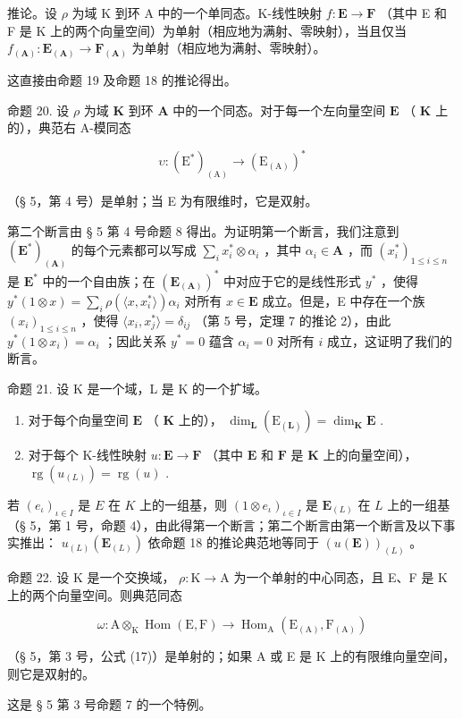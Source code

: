 推论。设 \(\rho\) 为域 K 到环 A 中的一个单同态。K-线性映射 \(f: \mathbf{E} \to \mathbf{F}\) （其中 E 和 F 是 K 上的两个向量空间）为单射（相应地为满射、零映射），当且仅当 \(f_{(\mathbf{A})}: \mathbf{E}_{(\mathbf{A})} \to \mathbf{F}_{(\mathbf{A})}\) 为单射（相应地为满射、零映射）。

这直接由命题 19 及命题 18 的推论得出。

命题 20. 设 \(\rho\) 为域 \(\mathbf{K}\) 到环 \(\mathbf{A}\) 中的一个同态。对于每一个左向量空间 \(\mathbf{E}\) （ \(\mathbf{K}\) 上的），典范右 A-模同态

\[
\upsilon : \left(\mathrm{E} ^ {*}\right) _ {(\mathrm{A})} \rightarrow \left(\mathrm{E} _ {(\mathrm{A})}\right) ^ {*}
\]

（§ 5，第 4 号）是单射；当 E 为有限维时，它是双射。

第二个断言由 § 5 第 4 号命题 8 得出。为证明第一个断言，我们注意到 \((\mathbf{E}^{*})_{(\mathbf{A})}\) 的每个元素都可以写成 \(\sum_{i} x_{i}^{*} \otimes \alpha_{i}\) ，其中 \(\alpha_{i} \in \mathbf{A}\) ，而 \((x_{i}^{*})_{1 \leqslant i \leqslant n}\) 是 \(\mathbf{E}^{*}\) 中的一个自由族；在 \((\mathbf{E}_{(\mathbf{A})})^{*}\) 中对应于它的是线性形式 \(y^{*}\) ，使得 \(y^{*}(1 \otimes x) = \sum_{i} \rho(\langle x, x_{i}^{*} \rangle)\alpha_{i}\) 对所有 \(x \in \mathbf{E}\) 成立。但是，E 中存在一个族 \((x_{i})_{1 \leqslant i \leqslant n}\) ，使得 \(\langle x_{i}, x_{j}^{*} \rangle = \delta_{ij}\) （第 5 号，定理 7 的推论 2），由此 \(y^{*}(1 \otimes x_{i}) = \alpha_{i}\) ；因此关系 \(y^{*} = 0\) 蕴含 \(\alpha_{i} = 0\) 对所有 \(i\) 成立，这证明了我们的断言。

命题 21. 设 K 是一个域，L 是 K 的一个扩域。

\begin{enumerate}
\def\labelenumi{(\roman{enumi})}
\item
  对于每个向量空间 \(\mathbf{E}\) （ \(\mathbf{K}\) 上的）， \(\dim_{\mathbf{L}}(\mathrm{E}_{(\mathbf{L})}) = \dim_{\mathbf{K}}\mathbf{E}\) .
\item
  对于每个 K-线性映射 \(u: \mathbf{E} \to \mathbf{F}\) （其中 \(\mathbf{E}\) 和 \(\mathbf{F}\) 是 \(\mathbf{K}\) 上的向量空间）， \(\operatorname{rg}(u_{(L)}) = \operatorname{rg}(u)\) .
\end{enumerate}

若 \((e_{\iota})_{\iota\in I}\) 是 \(E\) 在 \(K\) 上的一组基，则 \((1\otimes e_{\iota})_{\iota\in I}\) 是 \(\mathbf{E}_{(L)}\) 在 \(L\) 上的一组基（§ 5，第 1 号，命题 4），由此得第一个断言；第二个断言由第一个断言及以下事实推出： \(u_{(L)}(\mathbf{E}_{(L)})\) 依命题 18 的推论典范地等同于 \((u(\mathbf{E}))_{(L)}\) 。

命题 22. 设 K 是一个交换域， \(\rho: \mathrm{K} \to \mathrm{A}\) 为一个单射的中心同态，且 E、F 是 K 上的两个向量空间。则典范同态

\[
\omega : \mathrm{A} \otimes_ {\mathrm{K}} \operatorname{Hom} (\mathrm{E}, \mathrm{F}) \rightarrow \operatorname{Hom} _ {\mathrm{A}} \left(\mathrm{E} _ {(\mathrm{A})}, \mathrm{F} _ {(\mathrm{A})}\right)\tag{36}
\]

（§ 5，第 3 号，公式 (17)）是单射的；如果 A 或 E 是 K 上的有限维向量空间，则它是双射的。

这是 § 5 第 3 号命题 7 的一个特例。

